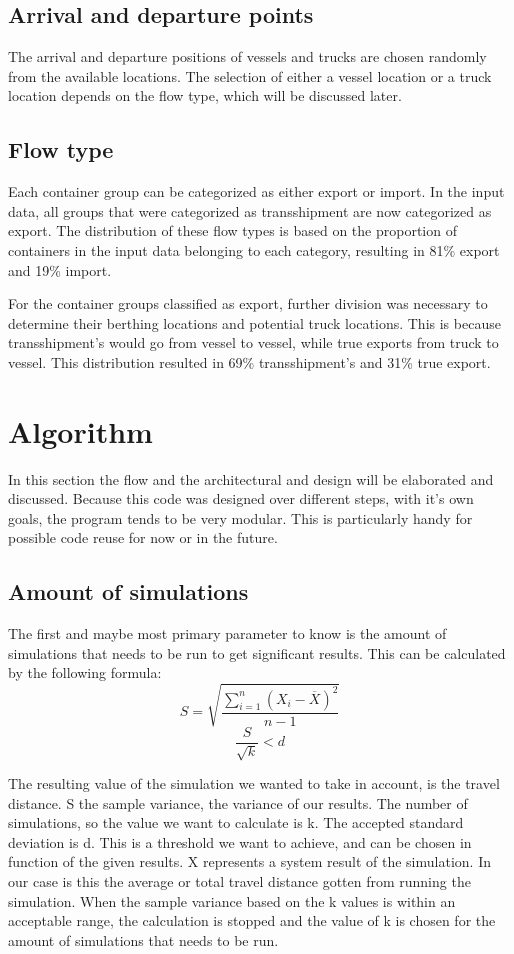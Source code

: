 \documentclass{article}
\begin{document}
\subsection{Arrival and departure points}
The arrival and departure positions of vessels and trucks are chosen randomly
from the available locations. The selection of either a vessel location or a
truck location depends on the flow type, which will be discussed later.

\subsection{Flow type}
Each container group can be categorized as either export or import. In the
input data, all groups that were categorized as transshipment are now
categorized as export. The distribution of these flow types is based on the
proportion of containers in the input data belonging to each category,
resulting in 81\% export and 19\% import.

For the container groups classified as export, further division was necessary
to determine their berthing locations and potential truck locations. This is
because transshipment's would go from vessel to vessel, while true exports from
truck to vessel. This distribution resulted in 69\% transshipment's and 31\%
true export.

\section{Algorithm}
In this section the flow and the architectural and design will be elaborated
and discussed. Because this code was designed over different steps, with it's
own goals, the program tends to be very modular. This is particularly handy for
possible code reuse for now or in the future.
\subsection{Amount of simulations}
The first and maybe most primary parameter to know is the amount of simulations
that needs to be run to get significant results. This can be calculated by the
following formula: \[S = \sqrt{\frac{\sum_{i = 1}^{n}(X_i-\overline{X})^2}{n
            -1}}\] \[\frac{S}{\sqrt{k}} < d\]

The resulting value of the simulation we wanted to take in account, is the
travel distance. S the sample variance, the variance of our results. The number
of simulations, so the value we want to calculate is k. The accepted standard
deviation is d. This is a threshold we want to achieve, and can be chosen in
function of the given results. X represents a system result of the simulation.
In our case is this the average or total travel distance gotten from running
the simulation. When the sample variance based on the k values is within an
acceptable range, the calculation is stopped and the value of k is chosen for
the amount of simulations that needs to be run.
\end{document}
